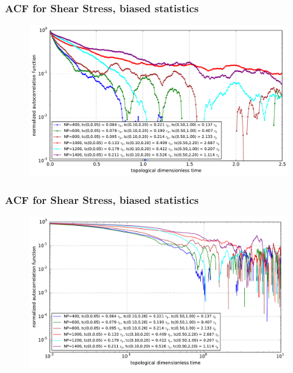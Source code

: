 \documentclass[slidestop, compress, mathserif]{beamer}
\begin{document}
\begin{frame}
  \frametitle<presentation>{ACF for Shear Stress, biased statistics}
  \begin{figure}
    \centering
    \includegraphics[width=\textwidth]{../check_ACF_NP_semilogy.pdf}
  \end{figure}
\end{frame}

\begin{frame}
  \frametitle<presentation>{ACF for Shear Stress, biased statistics}
  \begin{figure}
    \centering
    \includegraphics[width=\textwidth]{../check_ACF_NP_loglog.pdf}
  \end{figure}
\end{frame}


\end{document}
